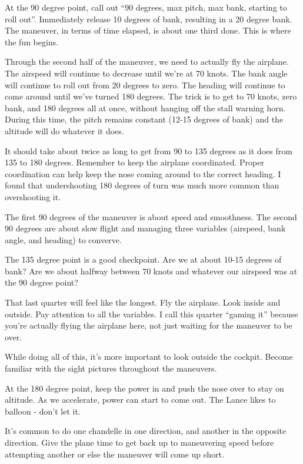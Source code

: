 At the 90 degree point, call out ``90 degrees, max pitch, max bank, starting to roll out''. Immediately release 10 degrees of bank, resulting in a 20 degree bank. The maneuver, in terms of time elapsed, is about one third done. This is where the fun begins.

Through the second half of the maneuver, we need to actually fly the airplane. The airspeed will continue to decrease until we're at 70 knots. The bank angle will continue to roll out from 20 degrees to zero. The heading will continue to come around until we've turned 180 degrees. The trick is to get to 70 knots, zero bank, and 180 degrees all at once, without hanging off the stall warning horn. During this time, the pitch remains constant (12-15 degrees of bank) and the altitude will do whatever it does.

It should take about twice as long to get from 90 to 135 degrees as it does from 135 to 180 degrees. Remember to keep the airplane coordinated. Proper coordination can help keep the nose coming around to the correct heading. I found that undershooting 180 degrees of turn was much more common than overshooting it.

The first 90 degrees of the maneuver is about speed and smoothness. The second 90 degrees are about slow flight and managing three variables (airspeed, bank angle, and heading) to converve.

The 135 degree point is a good checkpoint. Are we at about 10-15 degrees of bank? Are we about halfway between 70 knots and whatever our airspeed was at the 90 degree point?

That last quarter will feel like the longest. Fly the airplane. Look inside and outside. Pay attention to all the variables. I call this quarter ``gaming it'' because you're actually flying the airplane here, not just waiting for the maneuver to be over.

While doing all of this, it's more important to look outside the cockpit. Become familiar with the sight pictures throughout the maneuvers.

At the 180 degree point, keep the power in and push the nose over to stay on altitude. As we accelerate, power can start to come out. The Lance likes to balloon - don't let it.

It's common to do one chandelle in one direction, and another in the opposite direction. Give the plane time to get back up to maneuvering speed before attempting another or else the maneuver will come up short.

